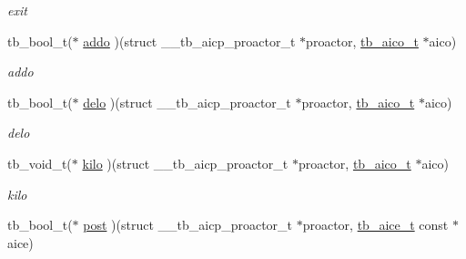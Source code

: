 \begin{DoxyCompactItemize}
\begin{DoxyCompactList}\small\item\em exit \end{DoxyCompactList}\item 
\hypertarget{structtb__aicp__proactor__t_af00c26e6bcf146a68248bcc6876b788a}{tb\-\_\-bool\-\_\-t($\ast$ \hyperlink{structtb__aicp__proactor__t_af00c26e6bcf146a68248bcc6876b788a}{addo} )(struct \-\_\-\-\_\-tb\-\_\-aicp\-\_\-proactor\-\_\-t $\ast$proactor, \hyperlink{structtb__aico__t}{tb\-\_\-aico\-\_\-t} $\ast$aico)}\label{structtb__aicp__proactor__t_af00c26e6bcf146a68248bcc6876b788a}

\begin{DoxyCompactList}\small\item\em addo \end{DoxyCompactList}\item 
\hypertarget{structtb__aicp__proactor__t_a5471548ffe572079d9261b9ee2172f19}{tb\-\_\-bool\-\_\-t($\ast$ \hyperlink{structtb__aicp__proactor__t_a5471548ffe572079d9261b9ee2172f19}{delo} )(struct \-\_\-\-\_\-tb\-\_\-aicp\-\_\-proactor\-\_\-t $\ast$proactor, \hyperlink{structtb__aico__t}{tb\-\_\-aico\-\_\-t} $\ast$aico)}\label{structtb__aicp__proactor__t_a5471548ffe572079d9261b9ee2172f19}

\begin{DoxyCompactList}\small\item\em delo \end{DoxyCompactList}\item 
\hypertarget{structtb__aicp__proactor__t_a548f0615d7daa30b79899a0f009e4da9}{tb\-\_\-void\-\_\-t($\ast$ \hyperlink{structtb__aicp__proactor__t_a548f0615d7daa30b79899a0f009e4da9}{kilo} )(struct \-\_\-\-\_\-tb\-\_\-aicp\-\_\-proactor\-\_\-t $\ast$proactor, \hyperlink{structtb__aico__t}{tb\-\_\-aico\-\_\-t} $\ast$aico)}\label{structtb__aicp__proactor__t_a548f0615d7daa30b79899a0f009e4da9}

\begin{DoxyCompactList}\small\item\em kilo \end{DoxyCompactList}\item 
\hypertarget{structtb__aicp__proactor__t_a5b3cd61adc6b0050659b025b8d484d2c}{tb\-\_\-bool\-\_\-t($\ast$ \hyperlink{structtb__aicp__proactor__t_a5b3cd61adc6b0050659b025b8d484d2c}{post} )(struct \-\_\-\-\_\-tb\-\_\-aicp\-\_\-proactor\-\_\-t $\ast$proactor, \hyperlink{structtb__aice__t}{tb\-\_\-aice\-\_\-t} const $\ast$aice)}\label{structtb__aicp__proactor__t_a5b3cd61adc6b0050659b025b8d484d2c}


\end{DoxyCompactItemize}
